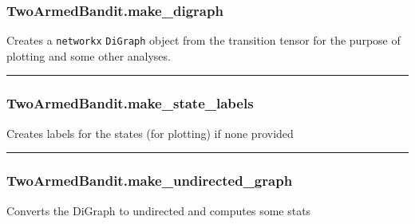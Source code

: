 \subsubsection{TwoArmedBandit.make\_digraph}\label{twoarmedbandit.make_digraph}

\begin{Shaded}
\begin{Highlighting}[]
\NormalTok{)}
\end{Highlighting}
\end{Shaded}

Creates a \texttt{networkx} \texttt{DiGraph} object from the transition
tensor for the purpose of plotting and some other analyses.

\begin{center}\rule{0.5\linewidth}{\linethickness}\end{center}

\subsubsection{TwoArmedBandit.make\_state\_labels}\label{twoarmedbandit.make_state_labels}

\begin{Shaded}
\begin{Highlighting}[]
\NormalTok{)}
\end{Highlighting}
\end{Shaded}

Creates labels for the states (for plotting) if none provided

\begin{center}\rule{0.5\linewidth}{\linethickness}\end{center}

\subsubsection{TwoArmedBandit.make\_undirected\_graph}\label{twoarmedbandit.make_undirected_graph}

\begin{Shaded}
\begin{Highlighting}[]
\NormalTok{)}
\end{Highlighting}
\end{Shaded}

Converts the DiGraph to undirected and computes some stats

